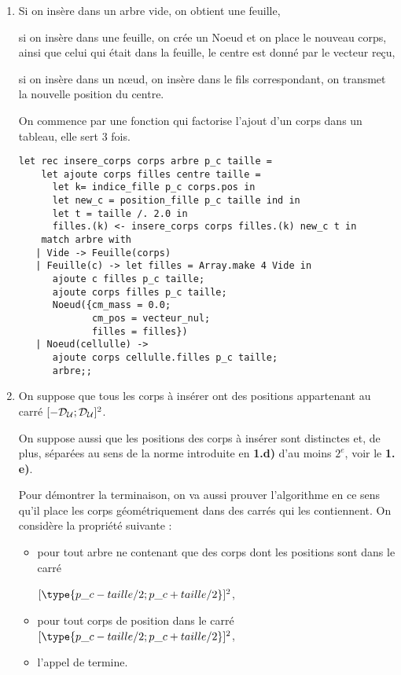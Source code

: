 \begin{Exercise}[title=Arbre-univers]
\renewcommand{\labelenumi}{\alph{enumi})}
\begin{enumerate}
   \itemsep6mm 
    \item Si on insère dans un arbre vide, on obtient une feuille,

si on insère dans une feuille, on crée un Noeud et on place le nouveau corps, ainsi que celui qui était dans la feuille, le centre est donné par le vecteur reçu,

si on insère dans un nœud, on insère dans le fils correspondant, on transmet la nouvelle position du centre.

On commence par une fonction qui factorise l'ajout d'un corps dans un tableau, elle sert 3 fois.
\begin{lstlisting}
let rec insere_corps corps arbre p_c taille = 
    let ajoute corps filles centre taille =
      let k= indice_fille p_c corps.pos in
      let new_c = position_fille p_c taille ind in
      let t = taille /. 2.0 in
      filles.(k) <- insere_corps corps filles.(k) new_c t in
    match arbre with
   | Vide -> Feuille(corps)
   | Feuille(c) -> let filles = Array.make 4 Vide in
      ajoute c filles p_c taille;
      ajoute corps filles p_c taille;
      Noeud({cm_mass = 0.0; 
             cm_pos = vecteur_nul; 
             filles = filles})
   | Noeud(cellulle) ->
      ajoute corps cellulle.filles p_c taille;
      arbre;;
\end{lstlisting}
    \item On suppose que tous les corps à insérer ont des positions appartenant au carré $[-{\cal D}_{\cal U}; {\cal D}_{\cal U}]^2$.
   
   On suppose aussi que les positions des corps à insérer sont distinctes et, de plus, séparées au sens de la norme introduite en {\bf 1.d)} d'au moins $2^{e}$, voir le {\bf 1. e)}. 
   
   Pour démontrer la terminaison, on va aussi prouver l'algorithme en ce sens qu'il place les corps géométriquement dans des carrés qui les contiennent. On considère la propriété suivante :
   
    \begin{itemize}
        \item pour tout arbre ne contenant que des corps dont les positions sont dans le carré 
        
        $[\type{p\_c - taille/2; p\_c + taille/2}]^2$,
        \item pour tout corps  de position dans le carré $[\type{p\_c - taille/2; p\_c + taille/2}]^2$,
        \item l'appel de  termine.
    \end{itemize}
    

\end{enumerate}
\end{Exercise}
